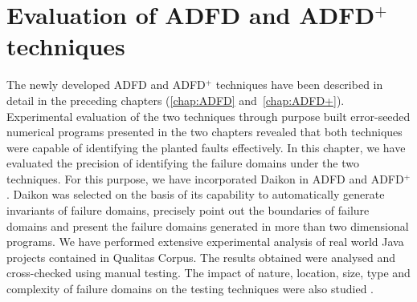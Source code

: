 
\chapter{Evaluation of ADFD and ADFD$^+$ techniques}
\label{chap:Evaluation}
	
The newly developed ADFD and ADFD$^+$ techniques have been described in detail in the preceding chapters (\ref{chap:ADFD} and~\ref{chap:ADFD+}). Experimental evaluation of the two techniques through purpose built error-seeded numerical programs presented in the two chapters revealed that both techniques were capable of identifying the planted faults effectively. In this chapter, we have evaluated the precision of identifying the failure domains under the two techniques. For this purpose, we have incorporated Daikon in ADFD and ADFD$^+$. Daikon was selected on the basis of its capability to automatically generate invariants of failure domains, precisely point out the boundaries of failure domains and present the failure domains generated in more than two dimensional programs. We have performed extensive experimental analysis of real world Java projects contained in Qualitas Corpus. The results obtained were analysed and cross-checked using manual testing. The impact of nature, location, size, type and complexity of failure domains on the testing techniques were also studied \cite{ahmad2014evaluation}. 




  





